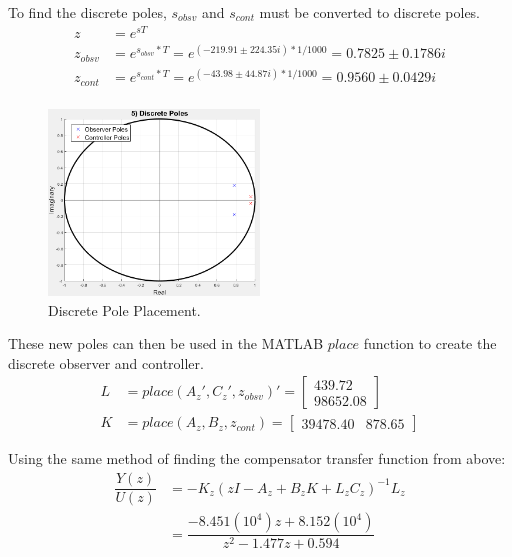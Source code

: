 \documentclass[11pt]{article}
\begin{document}
\begin{enumerate}[label=\textbf{\arabic*.}]
  To find the discrete poles, $s_{obsv}$ and $s_{cont}$ must be converted to 
  discrete poles.
  \begin{equation}
    \begin{split}
      z &= e^{sT} \\ 
      z_{obsv} &= e^{s_{obsv}*T} = e^{(-219.91 \pm 224.35i)*1/1000}
      = 0.7825 \pm 0.1786i \\
      z_{cont} &= e^{s_{cont}*T} = e^{(-43.98 \pm 44.87i)*1/1000}
      = 0.9560 \pm 0.0429i \\
    \end{split}
  \end{equation}
  \begin{figure}[H]
    \centering
    \includegraphics[width=0.5\textwidth]{p5.png}
    \caption{Discrete Pole Placement.}
  \end{figure}

  These new poles can then be used in the MATLAB $place$ function to create the 
  discrete observer and controller.
  \begin{equation}
    \begin{split}
      L &= place(A_z', C_z', z_{obsv})' = 
      \begin{bmatrix}
        439.72 \\ 98652.08
      \end{bmatrix} \\
      K &= place(A_z, B_z, z_{cont}) =
      \begin{bmatrix}
        39478.40 & 878.65
      \end{bmatrix}
    \end{split}
  \end{equation}

  Using the same method of finding the compensator transfer function from above:
  \begin{equation}
    \begin{split}
      \dfrac{Y(z)}{U(z)} &= -K_z(zI - A_z + B_zK + L_zC_z)^{-1}L_z \\
      &= \dfrac{-8.451(10^4)z + 8.152(10^4)}{z^2 - 1.477z + 0.594}
    \end{split}
  \end{equation}


\end{enumerate}
\end{document}
